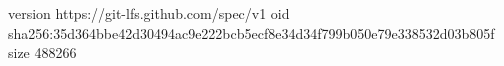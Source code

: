 version https://git-lfs.github.com/spec/v1
oid sha256:35d364bbe42d30494ac9e222bcb5ecf8e34d34f799b050e79e338532d03b805f
size 488266
